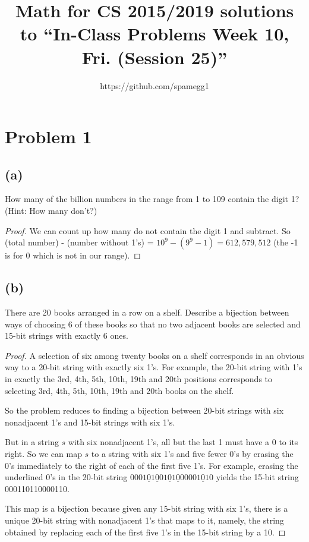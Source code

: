 \documentclass[14pt]{extarticle}
\title{Math for CS 2015/2019 solutions to ``In-Class Problems Week 10, Fri. (Session 25)''}
\author{https://github.com/spamegg1}
\begin{document}
\maketitle
\tableofcontents

\section{Problem 1}
\subsection{(a)}
How many of the billion numbers in the range from 1 to 109 contain the digit 1? (Hint: How many don’t?)
\begin{proof}
We can count up how many do not contain the digit 1 and subtract. So (total number) - (number without 1’s) = $10^9 -(9^9 -1) = 612,579,512$ (the -1 is for 0 which is not in our range).
\end{proof}

\subsection{(b)}
There are 20 books arranged in a row on a shelf. Describe a bijection between ways of choosing 6 of these books so that no two adjacent books are selected and 15-bit strings with exactly 6 ones.
\begin{proof}
A selection of six among twenty books on a shelf corresponds in an obvious way to a 20-bit string with exactly six 1’s. For example, the 20-bit string with 1’s in exactly the 3rd, 4th, 5th, 10th, 19th and 20th positions corresponds to selecting 3rd, 4th, 5th, 10th, 19th and 20th books on the shelf.

So the problem reduces to finding a bijection between 20-bit strings with six nonadjacent 1’s and 15-bit strings with six 1’s.

But in a string $s$ with six nonadjacent 1’s, all but the last 1 must have a 0 to its right. So we can map $s$ to a string with six 1’s and five fewer 0’s by erasing the 0’s immediately to the right of each of the first five 1’s. For example, erasing the underlined 0’s in the 20-bit string $0001\underline{0}1\underline{0}01\underline{0}1\underline{0}00001\underline{0}10$ yields the 15-bit string 000110110000110.

This map is a bijection because given any 15-bit string with six 1’s, there is a unique 20-bit string with nonadjacent 1’s that maps to it, namely, the string obtained by replacing each of the first five 1’s in the 15-bit string by a 10.
\end{proof}
\end{document}
